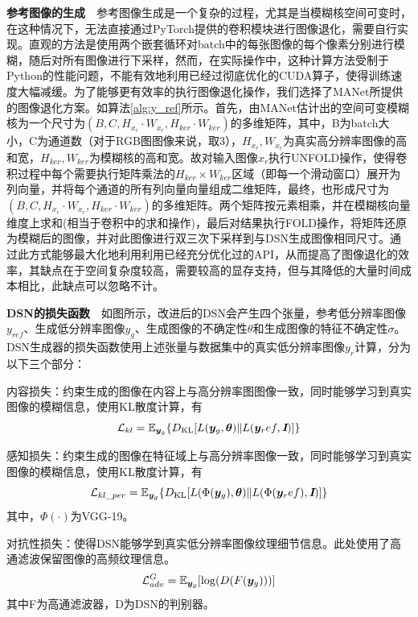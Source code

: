 \noindent\textbf{参考图像的生成}\ \ 参考图像生成是一个复杂的过程，尤其是当模糊核空间可变时，在这种情况下，无法直接通过PyTorch提供的卷积模块进行图像退化，需要自行实现。直观的方法是使用两个嵌套循环对batch中的每张图像的每个像素分别进行模糊，随后对所有图像进行下采样，然而，在实际操作中，这种计算方法受制于Python的性能问题，不能有效地利用已经过彻底优化的CUDA算子，使得训练速度大幅减缓。为了能够更有效率的执行图像退化操作，我们选择了MANet所提供的图像退化方案。如算法\ref{alg:y_ref}所示。首先，由MANet估计出的空间可变模糊核为一个尺寸为$(B,C,H_{x_r}\cdot W_{x_r},H_{ker}\cdot W_{ker})$的多维矩阵，其中，B为batch大小，C为通道数（对于RGB图图像来说，取3），$H_{x_r},W_{x_r}$为真实高分辨率图像的高和宽，$H_{ker},W_{ker}$为模糊核的高和宽。故对输入图像$x_r$执行UNFOLD操作，使得卷积过程中每个需要执行矩阵乘法的$H_{ker}\times W_{ker}$区域（即每一个滑动窗口）展开为列向量，并将每个通道的所有列向量向量组成二维矩阵，最终，也形成尺寸为$(B,C,H_{x_r}\cdot W_{x_r},H_{ker}\cdot W_{ker})$的多维矩阵。两个矩阵按元素相乘，并在模糊核向量维度上求和(相当于卷积中的求和操作)，最后对结果执行FOLD操作，将矩阵还原为模糊后的图像，并对此图像进行双三次下采样到与DSN生成图像相同尺寸。通过此方式能够最大化地利用利用已经充分优化过的API，从而提高了图像退化的效率，其缺点在于空间复杂度较高，需要较高的显存支持，但与其降低的大量时间成本相比，此缺点可以忽略不计。

\noindent\textbf{DSN的损失函数}\ \ 如图所示，改进后的DSN会产生四个张量，参考低分辨率图像$y_{ref}$、生成低分辨率图像$y_g$、生成图像的不确定性$\theta$和生成图像的特征不确定性$\sigma$。DSN生成器的损失函数使用上述张量与数据集中的真实低分辨率图像$y_r$计算，分为以下三个部分：

内容损失：约束生成的图像在内容上与高分辨率图图像一致，同时能够学习到真实图像的模糊信息，使用KL散度计算，有
\begin{equation}
    \mathcal{L}_{kl}=\mathbb{E}_{\vb*{y}_g}\{D_{\text{KL}}[L(\vb*{y}_g,\bm{\theta})\|L(\vb*{y}_ref,\textbf{\em I})]\}
\end{equation}

感知损失：约束生成的图像在特征域上与高分辨率图像一致，同时能够学习到真实图像的模糊信息，使用KL散度计算，有
\begin{equation}
    \mathcal{L}_{kl\_per}=\mathbb{E}_{\vb*{y}_g}\{D_{\text{KL}}[L(\Phi(\vb*{y}_g),\bm{\theta})\|L(\Phi(\vb*{y}_ref),\textbf{\em I})]\}
\end{equation}
其中，$\Phi(\cdot)$为VGG-19\parencite{simonyan2014very}。

对抗性损失：使得DSN能够学到真实低分辨率图像纹理细节信息。此处使用了高通滤波保留图像的高频纹理信息。
\begin{equation}
    \mathcal{L}_{adv}^G=\mathbb{E}_{\vb*{y}_g}[\log(D(F(\vb*{y}_g)))]
\end{equation}
其中F为高通滤波器，D为DSN的判别器。

